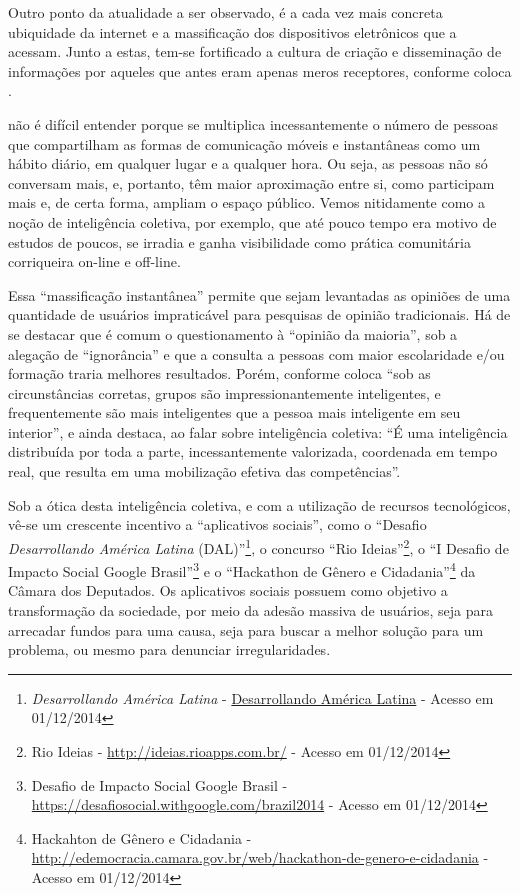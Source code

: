 Outro ponto da atualidade a ser observado, é a cada vez mais concreta ubiquidade da internet e a massificação dos dispositivos eletrônicos que a acessam. Junto a estas, tem-se fortificado a cultura de criação e disseminação de informações por aqueles que antes eram apenas meros receptores, conforme coloca .
\begin{citacao}
não é difícil entender porque se multiplica incessantemente o número de pessoas que compartilham as formas de comunicação móveis e instantâneas como um hábito diário, em qualquer lugar e a qualquer hora. Ou seja, as pessoas não só conversam mais, e, portanto, têm maior aproximação entre si, como participam mais e, de certa forma, ampliam o espaço público. Vemos nitidamente como a noção de inteligência coletiva, por exemplo, que até pouco tempo era motivo de estudos de poucos, se irradia e ganha visibilidade como prática comunitária corriqueira on-line e off-line.
\end{citacao}

Essa ``massificação instantânea'' permite que sejam levantadas as opiniões de uma quantidade de usuários impraticável para pesquisas de opinião tradicionais. Há de se destacar que é comum o questionamento à ``opinião da maioria'', sob a alegação de ``ignorância'' e que a consulta a pessoas com maior escolaridade e/ou formação traria melhores resultados. Porém, conforme coloca  ``sob as circunstâncias corretas, grupos são impressionantemente inteligentes, e frequentemente são mais inteligentes que a pessoa mais inteligente em seu interior'', e  ainda destaca, ao falar sobre inteligência coletiva: ``É uma inteligência distribuída por toda a parte, incessantemente valorizada, coordenada em tempo real, que resulta em uma mobilização efetiva das competências''.

Sob a ótica desta inteligência coletiva, e com a utilização de recursos tecnológicos, vê-se um crescente incentivo a ``aplicativos sociais'', como o ``Desafio \textit{Desarrollando América Latina} (DAL)''\footnote{\textit{Desarrollando América Latina} - \url{Desarrollando América Latina} - Acesso em 01/12/2014}, o concurso ``Rio Ideias''\footnote{Rio Ideias - \url{http://ideias.rioapps.com.br/} - Acesso em 01/12/2014}, o ``I Desafio de Impacto Social Google Brasil''\footnote{Desafio de Impacto Social Google Brasil - \url{https://desafiosocial.withgoogle.com/brazil2014} - Acesso em 01/12/2014} e o ``Hackathon de Gênero e Cidadania''\footnote{Hackahton de Gênero e Cidadania - \url{http://edemocracia.camara.gov.br/web/hackathon-de-genero-e-cidadania} - Acesso em 01/12/2014} da Câmara dos Deputados. Os aplicativos sociais possuem como objetivo a transformação da sociedade, por meio da adesão massiva de usuários, seja para arrecadar fundos para uma causa, seja para buscar a melhor solução para um problema, ou mesmo para denunciar irregularidades.

